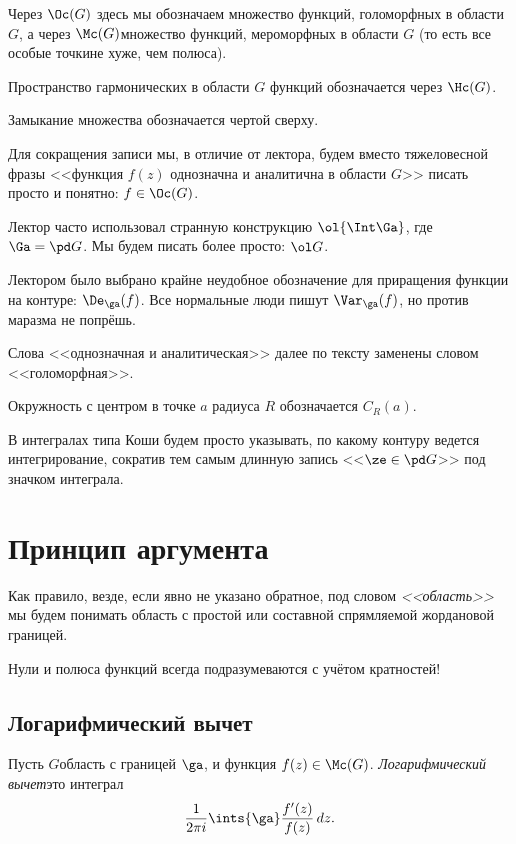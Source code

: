 \documentclass[a4paper]{article}
\def\dz{\,dz}
\begin{document}
\begin{items}{-2}
\item Через $\Oc(G)$ здесь мы обозначаем множество функций, голоморфных в области $G$, а через $\Mc(G)$\т множество
функций, мероморфных в области $G$ (то есть все особые точки\т не хуже, чем полюса).
\item Пространство гармонических в области $G$ функций обозначается через $\Hc(G)$.
\item Замыкание множества обозначается чертой сверху.
\item Для сокращения записи мы, в отличие от лектора, будем вместо тяжеловесной фразы <<функция $f(z)$
однозначна и аналитична в области $G$>> писать просто и понятно: $f\in \Oc(G)$.
\item Лектор часто использовал странную конструкцию $\ol{\Int \Ga}$, где $\Ga=\pd G$.
Мы будем писать более просто: $\ol G$.
\item Лектором было выбрано крайне неудобное обозначение для приращения функции на контуре: $\De_\ga(f)$.
Все нормальные люди пишут $\Var_\ga(f)$, но против маразма не попрёшь.
\item Слова <<однозначная и аналитическая>> далее по тексту заменены словом <<голоморфная>>.
\item Окружность с центром в точке $a$ радиуса $R$ обозначается $C_R(a)$.
\item В интегралах типа Коши будем просто указывать, по какому контуру ведется интегрирование, сократив тем самым
длинную запись <<$\ze \in \pd G$>> под значком интеграла.
\end{items}

\medskip
\dmvntrail

\pagebreak

\section{Принцип аргумента}

Как правило, везде, если явно не указано обратное, под словом \emph{<<область>>} мы будем понимать
область с простой или составной спрямляемой жордановой границей.

Нули и полюса функций всегда подразумеваются с учётом кратностей!

\subsection{Логарифмический вычет}

\begin{df}
Пусть $G$\т область с границей $\ga$, и функция $f(z)\in \Mc(G)$. \emph{Логарифмический вычет}\т это интеграл
$$\frac{1}{2\pi i}\ints{\ga} \frac{f'(z)}{f(z)}\dz.$$
\end{df}
\end{document}
